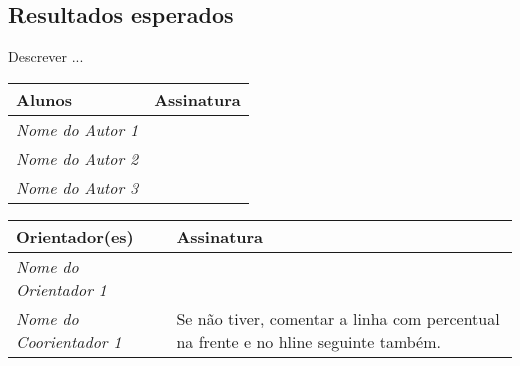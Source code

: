 \documentclass[article,12pt, a4paper]{abntex2}
\begin{document}





\subsection{Resultados esperados}
Descrever ...



    \newpage

    
\vspace{5cm}


    \begin{center}
		\begin{tabular}{|m{5cm}|m{10cm}|}
			\hline
			\textbf{Alunos} & \textbf{Assinatura} \\
			\hline
			\textit{Nome do Autor 1} & \\
			\hline
			\textit{Nome do Autor 2} & \\
			\hline
			\textit{Nome do Autor 3} & \\
			\hline
		\end{tabular}
	\end{center}

\vspace{0.5cm}

	\begin{center}
		\begin{tabular}{|m{5cm}|m{10cm}|}
			\hline
			\textbf{Orientador(es)} & \textbf{Assinatura} \\
			\hline
			\textit{Nome do Orientador 1} & \\
			\hline
			\textit{Nome do Coorientador 1} & Se não tiver, comentar a linha com percentual na frente e no hline seguinte também.\\
			\hline
		\end{tabular}
	\end{center}


%
\end{document}
